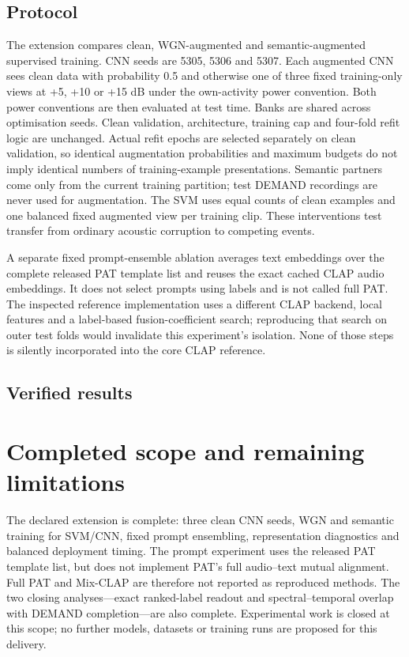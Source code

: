 \documentclass[a4paper,10pt]{article}
\begin{document}
\subsection{Protocol}
The extension compares clean, WGN-augmented and semantic-augmented supervised
training. CNN seeds are 5305, 5306 and 5307. Each augmented CNN sees clean data
with probability 0.5 and otherwise one of three fixed training-only views at
+5, +10 or +15 dB under the own-activity power convention. Both power conventions
are then evaluated at test time. Banks are shared across optimisation seeds. Clean validation,
architecture, training cap and four-fold refit logic are unchanged.
Actual refit epochs are selected separately on clean validation, so identical
augmentation probabilities and maximum budgets do not imply identical numbers
of training-example presentations. Semantic
partners come only from the current training partition; test DEMAND recordings
are never used for augmentation. The SVM uses equal counts of clean examples
and one balanced fixed augmented view per training clip. These interventions
test transfer from ordinary acoustic corruption to competing events.

A separate fixed prompt-ensemble ablation averages text embeddings over the
complete released PAT template list and reuses the exact cached CLAP audio
embeddings. It does not select prompts using labels and is not called full PAT.
The inspected reference implementation uses a different CLAP backend, local
features and a label-based fusion-coefficient search; reproducing that search
on outer test folds would invalidate this experiment's isolation. None of those
steps is silently incorporated into the core CLAP reference.

\subsection{Verified results}


\section{Completed scope and remaining limitations}
The declared extension is complete: three clean CNN seeds, WGN and semantic
training for SVM/CNN, fixed prompt ensembling, representation diagnostics and
balanced deployment timing. The prompt experiment uses the released PAT template
list, but does not implement PAT's full audio--text mutual alignment. Full PAT
and Mix-CLAP are therefore not reported as reproduced methods. The two closing
analyses---exact ranked-label readout and spectral--temporal overlap with DEMAND
completion---are also complete. Experimental work is closed at this scope;
no further models, datasets or training runs are proposed for this delivery.
\end{document}
